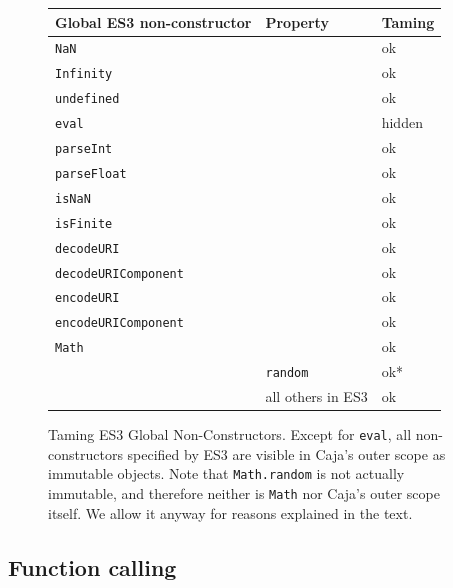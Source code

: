\documentclass[letterpaper,twocolumn,10pt]{article}
\newcommand{\code}[1]{{\tt {#1}}}              %
\begin{document}
\begin{figure}
\begin{tabular}{lll}
  Global ES3 non-constructor & Property                   & Taming \\
  \hline
  \code{NaN}                &                             & ok \\
  \code{Infinity}           &                             & ok \\
  \code{undefined}          &                             & ok \\
  \code{eval}               &                             & hidden \\
  \code{parseInt}           &                             & ok \\
  \code{parseFloat}         &                             & ok \\
  \code{isNaN}              &                             & ok \\
  \code{isFinite}           &                             & ok \\
  \hline
  \code{decodeURI}          &                             & ok \\
  \code{decodeURIComponent} &                             & ok \\
  \code{encodeURI}          &                             & ok \\
  \code{encodeURIComponent} &                             & ok \\
  \hline
  \code{Math}               &                             & ok \\  
                            & \code{random}               & ok* \\
                            &           all others in ES3 & ok \\
\end{tabular}

\caption[Taming ES3 Global Non-Constructors.]{Taming ES3 Global 
Non-Constructors. Except for \code{eval}, all non-constructors specified by 
ES3 are visible in Caja's outer scope as immutable objects. Note that 
\code{Math.random} is not actually immutable, and therefore neither is 
\code{Math} nor Caja's outer scope itself. We allow it anyway for reasons
explained in the text.}
\label{tab:taming-es3}
\end{figure}
  
\subsection{Function calling}
\end{document}
